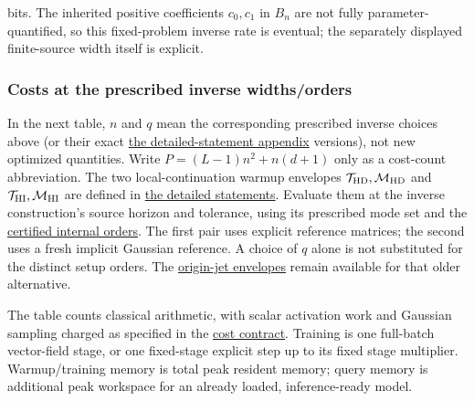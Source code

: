 bits. The inherited positive coefficients \(c_0,\allowbreak c_1\) in \(B_n\) are not fully parameter-quantified, so this fixed-problem inverse rate is eventual; the separately displayed finite-source width itself is explicit.


\subsubsection{Costs at the prescribed inverse widths/orders}
\label{int:cost-inverse-interface}


In the next table, \(n\) and \(q\) mean the corresponding prescribed inverse choices above (or their exact \hyperref[int:detailed-statements]{the detailed-statement appendix} versions), not new optimized quantities. Write \(P=(L-1)n^2+n(d+1)\) only as a cost-count abbreviation. The two local-continuation warmup envelopes \(\mathcal T_{\rm HD},\allowbreak \mathcal M_{\rm HD}\) and \(\mathcal T_{\rm HI},\allowbreak \mathcal M_{\rm HI}\) are defined in \hyperref[int:harmonic-efficient-initialization]{the detailed statements}. Evaluate them at the inverse construction's source horizon and tolerance, using its prescribed mode set and the \hyperref[int:harmonic-efficient-orders]{certified internal orders}. The first pair uses explicit reference matrices; the second uses a fresh implicit Gaussian reference. A choice of \(q\) alone is not substituted for the distinct setup orders. The \hyperref[int:harmonic-warmup-cost]{origin-jet envelopes} remain available for that older alternative.



The table counts classical arithmetic, with scalar activation work and Gaussian sampling charged as specified in the \hyperref[int:computational-costs]{cost contract}. Training is one full-batch vector-field stage, or one fixed-stage explicit step up to its fixed stage multiplier. Warmup/training memory is total peak resident memory; query memory is additional peak workspace for an already loaded, inference-ready model.


